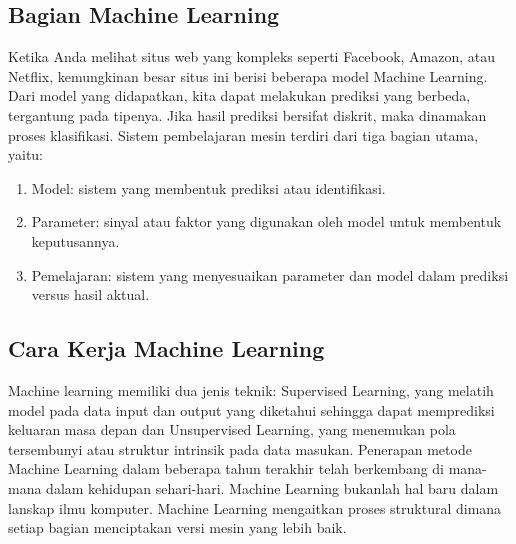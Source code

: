 \subsection{Bagian Machine Learning}
Ketika Anda melihat situs web yang kompleks seperti Facebook, Amazon, atau Netflix, kemungkinan besar situs ini berisi beberapa model Machine Learning. Dari model yang didapatkan, kita dapat melakukan prediksi yang berbeda, tergantung pada tipenya. Jika hasil prediksi bersifat diskrit, maka dinamakan proses klasifikasi. Sistem pembelajaran mesin terdiri dari tiga bagian utama, yaitu:
\begin{enumerate}
\item Model: sistem yang membentuk prediksi atau identifikasi.
\item Parameter: sinyal atau faktor yang digunakan oleh model untuk membentuk keputusannya.
\item Pemelajaran: sistem yang menyesuaikan parameter dan model dalam prediksi versus hasil aktual.
\end{enumerate}
\subsection{Cara Kerja Machine Learning}
Machine learning memiliki dua jenis teknik: Supervised Learning, yang melatih model pada data input dan output yang diketahui sehingga dapat memprediksi keluaran masa depan dan Unsupervised Learning, yang menemukan pola tersembunyi atau struktur intrinsik pada data masukan.
Penerapan metode Machine Learning dalam beberapa tahun terakhir telah berkembang di mana-mana dalam kehidupan sehari-hari. Machine Learning bukanlah hal baru dalam lanskap ilmu komputer. Machine Learning mengaitkan proses struktural dimana setiap bagian menciptakan versi mesin yang lebih baik.


